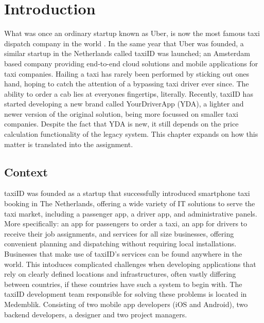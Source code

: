 \graphicspath{{Chapter1/Figs/Vector/}{Chapter1/Figs/}}

%
\chapter{Introduction}
What was once an ordinary startup known as Uber, is now the most famous taxi dispatch company in the world \cite{Uber}. In the same year that Uber was founded, a similar startup in the Netherlands called taxiID was launched; an Amsterdam based company providing end-to-end cloud solutions and mobile applications for taxi companies. Hailing a taxi has rarely been performed by sticking out ones hand, hoping to catch the attention of a bypassing taxi driver ever since. The ability to order a cab lies at everyones fingertips, literally. Recently, taxiID has started developing a new brand called YourDriverApp (YDA), a lighter and newer version of the original solution, being more focussed on smaller taxi companies. Despite the fact that YDA is new, it still depends on the price calculation functionality of the legacy system. This chapter expands on how this matter is translated into the assignment.

%
\section{Context}
taxiID was founded as a startup that successfully introduced smartphone taxi booking in The Netherlands, offering a wide variety of IT solutions to serve the taxi market, including a passenger app, a driver app, and administrative panels. More specifically: an app for passengers to order a taxi, an app for drivers to receive their job assignments, and services for all size businesses, offering convenient planning and dispatching without requiring local installations. Businesses that make use of taxiID's services can be found anywhere in the world. This intoduces complicated challenges when developing applications that rely on clearly defined locations and infrastructures, often vastly differing between countries, if these countries have such a system to begin with. The taxiID development team responsible for solving these problems is located in Medemblik. Consisting of two mobile app developers (iOS and Android), two backend developers, a designer and two project managers.

